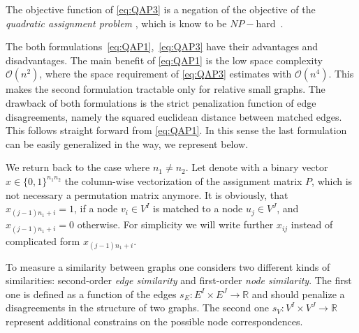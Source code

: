 The objective function of \eqref{eq:QAP3} is a negation of the objective of the \emph{quadratic assignment problem}%
, which is know to be $NP-$hard~\cite{Burkard98thequadratic,Sahni1974}.

The both formulations~\eqref{eq:QAP1},~\eqref{eq:QAP3} have their advantages and disadvantages. The main benefit of \eqref{eq:QAP1} is the low space complexity $\mathcal O(n^2)$, where the space requirement of \eqref{eq:QAP3} estimates with $\mathcal O(n^4)$. This makes the second formulation tractable only for relative small graphs. The drawback of both formulations is the strict penalization function of edge disagreements, namely the squared euclidean distance between matched edges. This follows straight forward from \eqref{eq:QAP1}. In this sense the last formulation can be easily generalized in the way, we represent below. 

We return back to the case where $n_1\not=n_2$. Let denote with a binary vector $x\in \{0,1\}^{n_1n_2}$ the column-wise vectorization of the assignment matrix $P$, which is not necessary a permutation matrix anymore. It is obviously, that $x_{(j-1)n_1+i}=1$, if a node $v_i\in V^I$ is matched to a node $u_j\in V^J$, and $x_{(j-1)n_1+i}=0$ otherwise. For simplicity we will write further $x_{ij}$ instead of complicated form $x_{(j-1)n_1+i}$.
 

To measure a similarity between graphs one considers two different kinds of similarities: second-order \emph{edge similarity} and first-order \emph{node similarity}. The first one is defined as a function of the edges $s_E:E^I\times E^J\rightarrow\mathbb{R}$ and should penalize a disagreements in the structure of two graphs. The second one $s_V:V^I\times V^J\rightarrow\mathbb{R}$ represent additional constrains on the possible node correspondences.



